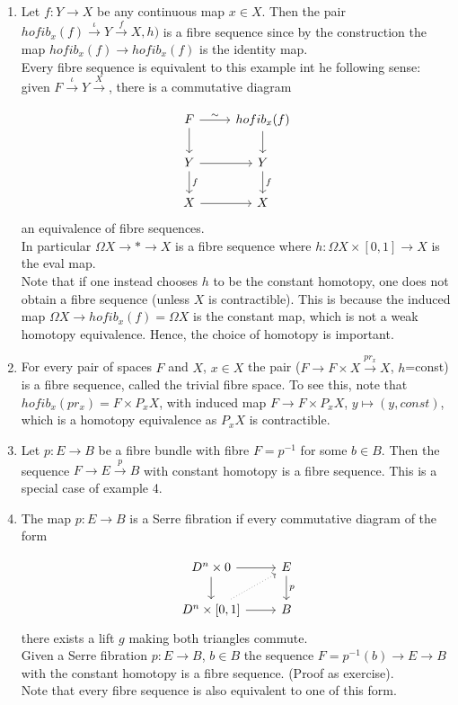 \documentclass[10pt,a4paper]{article}
\begin{document}
\begin{example}
\begin{enumerate}
\item Let $f:Y\to X$ be any continuous map $x\in X$. Then the pair $hofib_x(f)\xrightarrow{\iota} Y \xrightarrow{f} X,h)$ is a fibre sequence since by the construction the map $hofib_x(f)\to hofib_x(f)$ is the identity map.\\ Every fibre sequence is equivalent to this example int he following sense: given $F\xrightarrow{\iota} Y \xrightarrow{X}$, there is a commutative diagram

\[\begin{tikzcd}
F \arrow{r}{\sim} \arrow{d}& hofib_x(f)\arrow{d}\\
Y \arrow{r}\arrow{d}{f} & Y\arrow{d}{f}\\
X \arrow{r} & X
\end{tikzcd}\] an equivalence of fibre sequences.\\
In particular $\Omega X\to *\to X$ is a fibre sequence where $h:\Omega X\times [0,1]\to X$ is the eval map.\\
Note that if one instead chooses $h$ to be the constant homotopy, one does not obtain a fibre sequence (unless $X$ is contractible). This is because the induced map $\Omega X \to hofib_x(f) = \Omega X$ is the constant map, which is not a weak homotopy equivalence. Hence, the choice of homotopy is important.

\item For every pair of spaces $F$ and $X$, $x\in X$ the pair ($F\to F\times X\xrightarrow{pr_x} X$, $h$=const) is a fibre sequence, called the trivial fibre space. To see this, note that $hofib_x(pr_x)=F\times P_xX$, with induced map $F\to F\times P_x X$, $y\mapsto (y,const)$, which is a homotopy equivalence as $P_xX$ is contractible.

\item Let $p:E\to B$ be a fibre bundle with fibre $F=p^{-1}$ for some $b\in B$. Then the sequence $F\to E\xrightarrow{p} B$ with constant homotopy is a fibre sequence. This is a special case of example 4.

\item The map $p:E\to B$ is a Serre fibration if every commutative diagram of the form 

\[\begin{tikzcd}
D^n\times 0 \arrow{r}\arrow{d} & E \arrow{d}{p}\\
D^n\times[0,1]\arrow[ur, dotted]{g}\arrow{r}& B
\end{tikzcd}\]
there exists a lift $g$ making both triangles commute.\\
Given a Serre fibration $p:E\to B$, $b\in B$ the sequence $F = p^{-1}(b) \to E\to B$ with the constant homotopy is a fibre sequence. (Proof as exercise).\\
Note that every fibre sequence is also equivalent to one of this form.


\end{enumerate}
\end{example}
\end{document}
